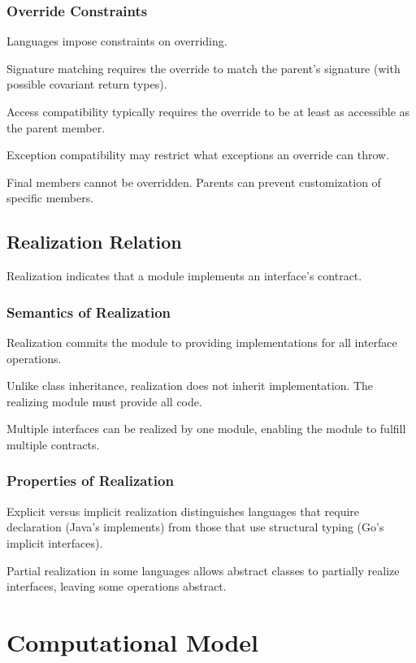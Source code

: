\documentclass[11pt]{article}
\begin{document}
\subsubsection{Override Constraints}

Languages impose constraints on overriding.

Signature matching requires the override to match the parent's signature (with possible covariant return types).

Access compatibility typically requires the override to be at least as accessible as the parent member.

Exception compatibility may restrict what exceptions an override can throw.

Final members cannot be overridden. Parents can prevent customization of specific members.

\subsection{Realization Relation}

Realization indicates that a module implements an interface's contract.

\subsubsection{Semantics of Realization}

Realization commits the module to providing implementations for all interface operations.

Unlike class inheritance, realization does not inherit implementation. The realizing module must provide all code.

Multiple interfaces can be realized by one module, enabling the module to fulfill multiple contracts.

\subsubsection{Properties of Realization}

Explicit versus implicit realization distinguishes languages that require declaration (Java's implements) from those that use structural typing (Go's implicit interfaces).

Partial realization in some languages allows abstract classes to partially realize interfaces, leaving some operations abstract.

\section{Computational Model}
\end{document}

